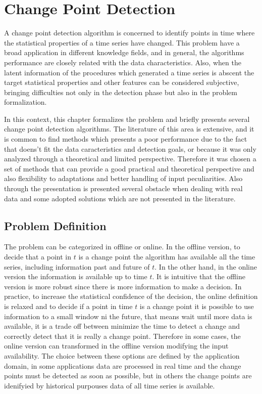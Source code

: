 \chapter{Change Point Detection} 

A change point detection algorithm is concerned to identify points in time where the statistical properties of a time series have changed. This problem have a broad application in different knowledge fields, and in general, the algorithms performance are closely related with the data characteristics. Also, when the latent information of the procedures which generated a time series is abscent the target statistical properties and other features can be considered subjective, bringing difficulties not only in the detection phase but also in the problem formalization.

In this context, this chapter formalizes the problem and briefly presents several change point detection algorithms. The literature of this area is extensive, and it is common to find methods which presents a poor performance due to the fact that doens't fit the data caracteristics and detection goals, or because it was only analyzed through a theoretical and limited perspective. Therefore it was chosen a set of methods that can provide a good practical and theoretical perspective and also flexibility to adaptations and better handling of input peculiarities. Also through the presentation is presented several obstacle when dealing with real data and some adopted solutions which are not presented in the literature.

\section{Problem Definition}

The problem can be categorized in offline or online. In the offline version, to decide that a point in $t$ is a change point the algorithm has available all the time series, including information past and future of $t$. In the other hand, in the online version the information is available up to time $t$. It is intuitive that the offline version is more robust since there is more information to make a decision. In practice, to increase the statistical confidence of the decision, the online definition is relaxed and to decide if a point in time $t$ is a change point it is possible to use information to a small window ni the future, that means wait until more data is available, it is a trade off between minimize the time to detect a change and correctly detect that it is really a change point. Therefore in some cases, the online version can transformed in the offline version modifying the input availability. The choice between these options are defined by the application domain, in some applications data are processed in real time and the change points must be detected as soon as possible, but in others the change points are idenifyied by historical purpouses data of all time series is available. 

